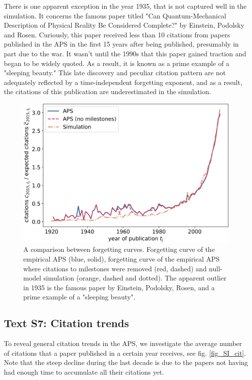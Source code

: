 \documentclass[fleqn,10pt]{wlscirep}
\begin{document}
There is one apparent exception in the year 1935, that is not captured well in the simulation. It concerns the famous paper titled "Can Quantum-Mechanical Description of Physical Reality Be Considered Complete?" by Einstein, Podolsky and Rosen. Curiously, this paper received less than 10 citations from papers published in the APS in the first 15 years after being published, presumably in part due to the war. It wasn't until the 1990s that this paper gained traction and began to be widely quoted. As a result, it is known as a prime example of a "sleeping beauty." This late discovery and peculiar citation pattern are not adequately reflected by a time-independent forgetting exponent, and as a result, the citations of this publication are underestimated in the simulation.



\begin{figure}[H]
	\centering
	 \includegraphics[width=0.7\columnwidth]{SI7.png}
	\caption{A comparison between forgetting curves. Forgetting curve of the empirical APS (blue, solid), forgetting curve of the empirical APS where citations to milestones were removed (red, dashed) and null-model simulation (orange, dashed and dotted). The apparent outlier in 1935 is the famous paper by Einstein, Podolsky, Rosen, and a prime example of a "sleeping beauty". 
	}
	\label{fig:SI6}
\end{figure}



\subsection*{Text S7: Citation trends}
\label{SI7}

To reveal general citation trends in the APS, we investigate the average number of citations that a paper published in a certain year receives, see fig. \ref{fig_SI_cit}. Note that the steep decline during the last decade is due to the papers not having had enough time to accumulate all their citations yet.
\end{document}
